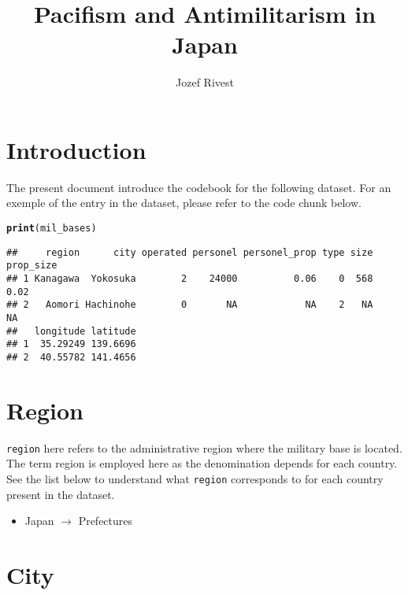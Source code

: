 \documentclass{article}\usepackage[]{graphicx}\usepackage[dvipsnames]{xcolor}
\title{Pacifism and Antimilitarism in Japan}
\author{Jozef Rivest}
\date{ }
\makeatletter
\newcommand{\hldef}[1]{\textcolor[rgb]{0.345,0.345,0.345}{#1}}%
\newcommand{\hlkwd}[1]{\textcolor[rgb]{0.737,0.353,0.396}{\textbf{#1}}}%
\newenvironment{kframe}{%
 \def\at@end@of@kframe{}%
 \ifinner\ifhmode%
  \def\at@end@of@kframe{\end{minipage}}%
  \begin{minipage}{\columnwidth}%
 \fi\fi%
 \def\FrameCommand##1{\hskip\@totalleftmargin \hskip-\fboxsep
 \colorbox{shadecolor}{##1}\hskip-\fboxsep
     \hskip-\linewidth \hskip-\@totalleftmargin \hskip\columnwidth}%
 \MakeFramed {\advance\hsize-\width
   \@totalleftmargin\z@ \linewidth\hsize
   \@setminipage}}%
 {\par\unskip\endMakeFramed%
 \at@end@of@kframe}
\newenvironment{knitrout}{}{} %
\makeatother
\begin{document}
\maketitle
\tableofcontents



\clearpage

\section{Introduction}

The present document introduce the codebook 
for the following dataset. For an exemple of 
the entry in the dataset, please refer to the 
code chunk below. 

\begin{knitrout}\footnotesize
{}\color{fgcolor}\begin{kframe}
\begin{alltt}
\hlkwd{print}\hldef{(mil_bases)}
\end{alltt}
\begin{verbatim}
##     region      city operated personel personel_prop type size prop_size
## 1 Kanagawa  Yokosuka        2    24000          0.06    0  568      0.02
## 2   Aomori Hachinohe        0       NA            NA    2   NA        NA
##   longitude latitude
## 1  35.29249 139.6696
## 2  40.55782 141.4656
\end{verbatim}
\end{kframe}
\end{knitrout}


\section{Region}

\verb|region| here refers to the administrative region 
where the military base is located. The term region 
is employed here as the denomination depends for each 
country. See the list below to understand what \verb|region|
corresponds to for each country present in the dataset. 

\begin{itemize}
  \item Japan $\rightarrow$ Prefectures
\end{itemize}

\section{City}
\end{document}
